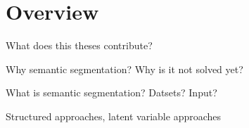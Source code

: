 \section{Overview}
What does this theses contribute?

Why semantic segmentation?
Why is it not solved yet?

What is semantic segmentation?
Datsets? Input?

Structured approaches, latent variable approaches
